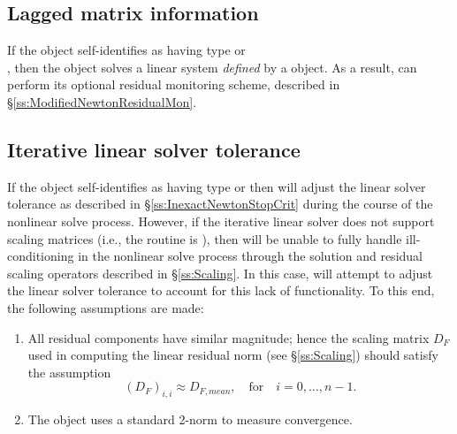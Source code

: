 \subsection{Lagged matrix information}
\label{ss:sunlinsol_lagged_matrix}

If the {\sunlinsol} object self-identifies as having type
 or \\ \noindent
{}, then the {\sunlinsol} object solves a
linear system \emph{defined} by a {\sunmatrix} object. As a result,
{\kinsol} can perform its optional residual monitoring scheme,
described in \S\ref{ss:ModifiedNewtonResidualMon}.

\subsection{Iterative linear solver tolerance}
\label{ss:sunlinsol_iterative_tolerance}

If the {\sunlinsol} object self-identifies as having type
 or \newline
{} then {\kinls} will adjust the linear solver
tolerance  as described in \S\ref{ss:InexactNewtonStopCrit}
during the course of the nonlinear solve process. However, if the
iterative linear solver does not support scaling matrices (i.e., the
 routine is ), then {\kinls} will
be unable to fully handle ill-conditioning in the nonlinear solve process
through the solution and residual scaling operators described in
\S\ref{ss:Scaling}. In this case, {\kinls} will attempt to adjust the linear
solver tolerance to account for this lack of functionality. To this end, the
following assumptions are made:
\begin{enumerate}
\item All residual components have similar magnitude; hence the
  scaling matrix $D_F$ used in computing the linear residual norm (see
  \S\ref{ss:Scaling}) should satisfy the assumption
  \[
    (D_F)_{i,i} \approx D_{F,mean},\quad \text{for}\quad i=0,\ldots,n-1.
  \]
\item The {\sunlinsol} object uses a standard 2-norm to measure
  convergence.
\end{enumerate}

